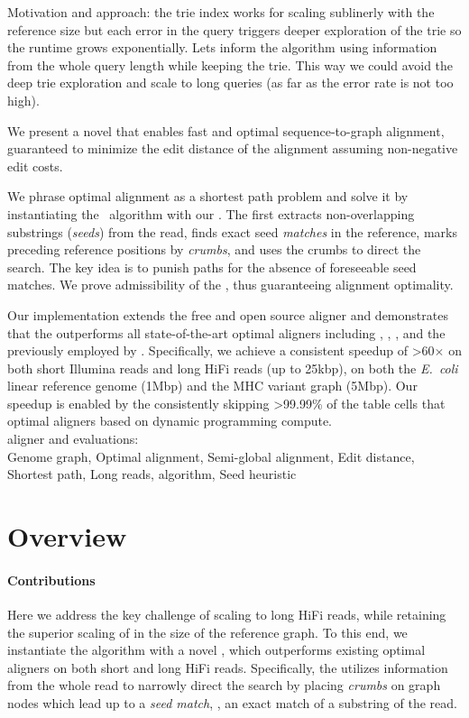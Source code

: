 %
Motivation and approach: the trie index works for scaling sublinerly with the
reference size but each error in the query triggers deeper exploration of the
trie so the runtime grows exponentially. Lets inform the \A algorithm using
information from the whole query length while keeping the trie. This way we
could avoid the deep trie exploration and scale to long queries (as far as the
error rate is not too high).

We present a novel \A \emph{\seedh} that enables fast and optimal
sequence-to-graph alignment, guaranteed to minimize the edit distance of the
alignment assuming non-negative edit costs.

We phrase optimal alignment as a shortest path problem and solve it by
instantiating the \A~algorithm with our \seedh. The \seedh first extracts
non-overlapping substrings (\emph{seeds}) from the read, finds exact seed
\emph{matches} in the reference, marks preceding reference positions by
\emph{crumbs}, and uses the crumbs to direct the \A search. The key idea is to
punish paths for the absence of foreseeable seed matches. We prove admissibility
of the \seedh, thus guaranteeing alignment optimality.

\qquad Our implementation extends the free and open source aligner and
demonstrates that the \seedh outperforms all state-of-the-art optimal aligners
including \graphaligner, \vargas, \pasgal, and the \prefixh previously employed
by \astarix. Specifically, we achieve a consistent speedup of >60$\times$ on
both short Illumina reads and long HiFi reads (up to 25kbp), on both the
\textit{E.~coli} linear reference genome (1Mbp) and the MHC variant graph
(5Mbp). Our speedup is enabled by the \seedh consistently skipping >99.99\% of
the table cells that optimal aligners based on dynamic programming
compute.\\

\astarix aligner and evaluations: \astarixurl\\

Genome graph, Optimal alignment, Semi-global alignment, Edit distance, Shortest
path, Long reads, \A algorithm, Seed heuristic
\section{Overview}

\paragraph{Contributions}
%
Here we address the key challenge of scaling to long HiFi reads, while
retaining the superior scaling of \astarix in the size of the reference graph.
%
To this end, we instantiate the \A algorithm with a novel \seedh, which
outperforms existing optimal aligners on both short and long HiFi reads.
%
Specifically, the \seedh utilizes information from the whole read to narrowly
direct the \A search by placing \emph{crumbs} on graph nodes which lead up to a
\emph{seed match}, \ie, an exact match of a substring of the read.

